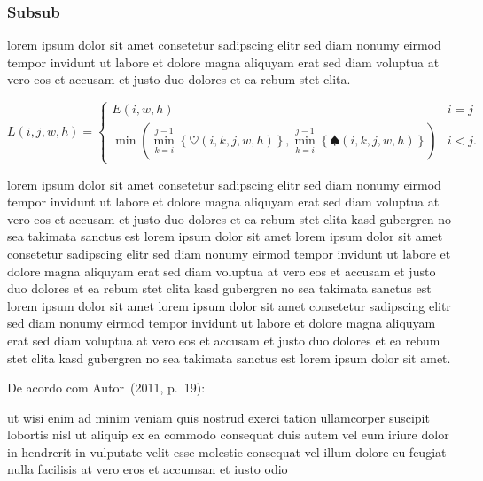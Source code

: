 \subsubsection{Subsub}

lorem ipsum dolor sit amet consetetur sadipscing elitr sed diam nonumy
eirmod tempor invidunt ut labore et dolore magna aliquyam erat sed diam
voluptua at vero eos et accusam et justo duo dolores et ea rebum
stet clita.~\cite{GOLDENBERGAPL02}

\begin{equation}\label{eq:apl}%
    L\left(i,j,w,h\right)=
    \begin{cases}
      E\left(i,w,h\right) & i=j\\
      \min\left(\min_{k=i}^{j-1}\left\{\heartsuit\left(i,k,j,w,h\right)\right\},
                \min_{k=i}^{j-1}\left\{\spadesuit\left(i,k,j,w,h\right)\right\}\right) & i<j\text{.}
    \end{cases}
\end{equation}

lorem ipsum dolor sit amet consetetur sadipscing elitr sed diam nonumy
eirmod tempor invidunt ut labore et dolore magna aliquyam erat sed diam
voluptua at vero eos et accusam et justo duo dolores et ea rebum stet clita
kasd gubergren no sea takimata sanctus est lorem ipsum dolor sit amet lorem
ipsum dolor sit amet consetetur sadipscing elitr sed diam nonumy eirmod
tempor invidunt ut labore et dolore magna aliquyam erat sed diam voluptua at
vero eos et accusam et justo duo dolores et ea rebum stet clita kasd
gubergren no sea takimata sanctus est lorem ipsum dolor sit amet lorem ipsum
dolor sit amet consetetur sadipscing elitr sed diam nonumy eirmod tempor
invidunt ut labore et dolore magna aliquyam erat sed diam voluptua at vero
eos et accusam et justo duo dolores et ea rebum stet clita kasd gubergren no
sea takimata sanctus est lorem ipsum dolor sit amet.

%
De acordo com Autor~(2011, p.~19):

\begin{directcite}
ut wisi enim ad minim veniam quis nostrud exerci tation ullamcorper suscipit
lobortis nisl ut aliquip ex ea commodo consequat duis autem vel eum iriure
dolor in hendrerit in vulputate velit esse molestie consequat vel illum
dolore eu feugiat nulla facilisis at vero eros et accumsan et
iusto odio
\end{directcite}

